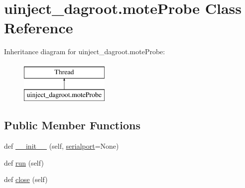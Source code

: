 \hypertarget{classuinject__dagroot_1_1mote_probe}{}\section{uinject\+\_\+dagroot.\+mote\+Probe Class Reference}
\label{classuinject__dagroot_1_1mote_probe}
Inheritance diagram for uinject\+\_\+dagroot.\+mote\+Probe\+:\begin{figure}[H]
\begin{center}
\leavevmode
\includegraphics[height=2.000000cm]{classuinject__dagroot_1_1mote_probe}
\end{center}
\end{figure}
\subsection*{Public Member Functions}
\begin{DoxyCompactItemize}
\item 
def \hyperlink{classuinject__dagroot_1_1mote_probe_abe99dd4f15ac2b413c6de0c6e88f542b}{\+\_\+\+\_\+init\+\_\+\+\_\+} (self, \hyperlink{classuinject__dagroot_1_1mote_probe_a14b163224b5fac9aa1c93aac7b212256}{serialport}=None)
\item 
def \hyperlink{classuinject__dagroot_1_1mote_probe_ae0e4a1890cfe04107bb44a6f24f4b7bf}{run} (self)
\item 
def \hyperlink{classuinject__dagroot_1_1mote_probe_a54807b2a66d5aa54cf848edf0bbc7626}{close} (self)
\end{DoxyCompactItemize}

